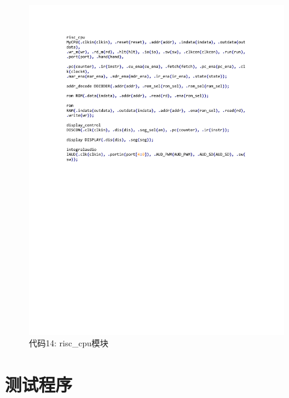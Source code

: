 \documentclass[titlepage, 11pt]{article}
\begin{document}
			\begin{figure}[H]
				\centering
				\includegraphics[scale=1]{35.pdf}
				\caption*{代码14: risc\_cpu模块}
			\end{figure}
	\section{测试程序}
\end{document}
